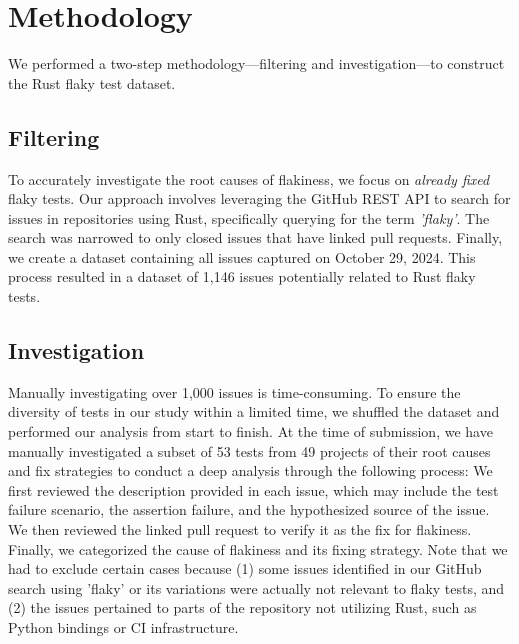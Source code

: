 \section{Methodology}
\label{sec:methodology}
We performed a two-step methodology—filtering and investigation—to construct the Rust flaky test dataset.

\subsection{Filtering}
To accurately investigate the root causes of flakiness, we focus on \textit{already fixed} flaky tests. Our approach involves leveraging the GitHub REST API to search for issues in repositories using Rust, specifically querying for the term \textit{'flaky'}. The search was narrowed to only closed issues that have linked pull requests. Finally, we create a dataset containing all issues captured on October 29, 2024. 
This process resulted in a dataset of 1,146 issues potentially related to Rust flaky tests. 


\subsection{Investigation}
Manually investigating over 1,000 issues is time-consuming. To ensure the diversity of tests in our study within a limited time, we shuffled the dataset and performed our analysis from start to finish. At the time of submission, we have manually investigated a subset of 53 tests from 49 projects of their root causes and fix strategies to conduct a deep analysis through the following process: 
We first reviewed the description provided in each issue, which may include the test failure scenario, the assertion failure, and the hypothesized source of the issue. We then reviewed the linked pull request to verify it as the fix for flakiness. Finally, we categorized the cause of flakiness and its fixing strategy. Note that we had to exclude certain cases because (1) some issues identified in our GitHub search using 'flaky' or its variations were actually not relevant to flaky tests, and (2) the issues pertained to parts of the repository not utilizing Rust, such as Python bindings or CI infrastructure.

